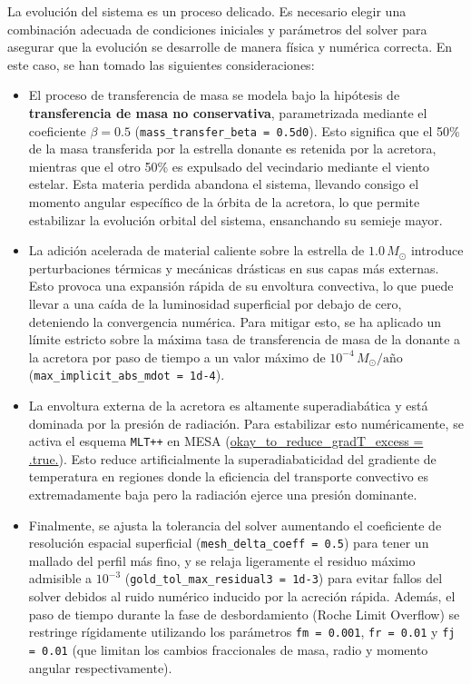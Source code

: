 La evolución del sistema es un proceso delicado. Es necesario elegir una combinación adecuada de condiciones iniciales y parámetros del solver para asegurar que la evolución se desarrolle de manera física y numérica correcta. En este caso, se han tomado las siguientes consideraciones:
\begin{itemize}

  \item El proceso de transferencia de masa se modela bajo la hipótesis de \textbf{transferencia de masa no conservativa}, parametrizada mediante el coeficiente $\beta = 0.5$ (\texttt{mass\_\allowbreak transfer\_beta = 0.5d0}). Esto significa que el 50\% de la masa transferida por la estrella donante es retenida por la acretora, mientras que el otro 50\% es expulsado del vecindario mediante el viento estelar. Esta materia perdida abandona el sistema, llevando consigo el momento angular específico de la órbita de la acretora, lo que permite estabilizar la evolución orbital del sistema, ensanchando su semieje mayor.

  \item La adición acelerada de material caliente sobre la estrella de $1.0\,M_\odot$ introduce perturbaciones térmicas y mecánicas drásticas en sus capas más externas. Esto provoca una expansión rápida de su envoltura convectiva, lo que puede llevar a una caída de la luminosidad superficial por debajo de cero, deteniendo la convergencia numérica. Para mitigar esto, se ha aplicado un límite estricto sobre la máxima tasa de transferencia de masa de la donante a la acretora por paso de tiempo a un valor máximo de $10^{-4}\,M_\odot/\text{año}$ (\texttt{max\_implicit\_abs\_mdot = 1d-4}).

  \item La envoltura externa de la acretora es altamente superadiabática y está dominada por la presión de radiación. Para estabilizar esto numéricamente, se activa el esquema \texttt{MLT++} en MESA (\url{okay\_to\_reduce\_gradT\_excess = .true.}). Esto reduce artificialmente la superadiabaticidad del gradiente de temperatura en regiones donde la eficiencia del transporte convectivo es extremadamente baja pero la radiación ejerce una presión dominante.

  \item Finalmente, se ajusta la tolerancia del solver aumentando el coeficiente de resolución espacial superficial (\texttt{mesh\_delta\_coeff = 0.5}) para tener un mallado del perfil más fino, y se relaja ligeramente el residuo máximo admisible a $10^{-3}$ (\texttt{gold\_\allowbreak tol\_max\_residual3 = 1d-3}) para evitar fallos del solver debidos al ruido numérico inducido por la acreción rápida. Además, el paso de tiempo durante la fase de desbordamiento (Roche Limit Overflow) se restringe rígidamente utilizando los parámetros \texttt{fm = 0.001}, \texttt{fr = 0.01} y \texttt{fj = 0.01} (que limitan los cambios fraccionales de masa, radio y momento angular respectivamente).


\end{itemize}

